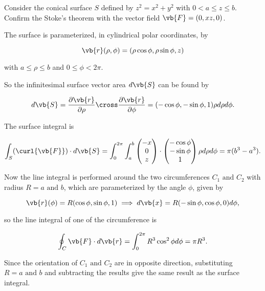 \documentclass[english,a4paper,12pt]{report}
\begin{document}
{Consider the conical surface \(S\) defined by \(z^2 = x^2+ y^2\) with \(0 < a \le z \le b\). Confirm the Stoke's theorem with the vector field \(\vb{F} = (0,xz,0)\).   }
{The surface is parameterized, in cylindrical polar coordinates, by 

\begin{equation}
	\vb{r} (\rho , \phi ) = (\rho \cos \phi , \rho \sin \phi , z)
\end{equation}

with \(a \le \rho \le b\) and \(0 \le \phi  < 2\pi \).  

So the infinitesimal surface vector area \(d\vb{S} \) can be found by 

\begin{equation}
	d\vb{S}  = \frac{\partial \vb{r} }{\partial \rho } \cross \frac{\partial \vb{r} }{\partial \phi } = (- \cos \phi , - \sin \phi , 1 ) \rho d\rho d\phi .  
\end{equation}

The surface integral is 

\begin{equation}
	\int_{S}^{} (\curl{\vb{F} } ) \cdot d\vb{S} = \int_{0}^{2\pi } \int_{a}^{b} \begin{pmatrix}
		 -x \\
		 0 \\
		 z \\
	\end{pmatrix} \cdot \begin{pmatrix}
		 -\cos \phi  \\
		 -\sin \phi  \\
		 1 \\
	\end{pmatrix} \rho d\rho d\phi = \pi (b^3 -a^3 ).
\end{equation}

Now the line integral is performed around the two circumferences \(C_1 \text { and } C_2 \) with radius \(R = a \text { and } b\), which are parameterized by the angle \(\phi \), given by 

\begin{equation}
	\vb{r} (\phi ) = R(\cos \phi , \sin \phi , 1) \implies d\vb{x} = R(-\sin \phi , \cos \phi ,0)d\phi ,
\end{equation}

so the line integral of one of the circumference is 

\begin{equation}
	\oint_{C} \vb{F} \cdot d\vb{r} = \int_{0}^{2\pi } R^3 \cos ^2\phi d\phi = \pi R^3 .  
\end{equation}

Since the orientation of \(C_1 \text { and } C_2 \) are in opposite direction, substituting \(R = a \text { and } b\) and subtracting the results give the same result as the surface integral.   
} 
\end{document}
